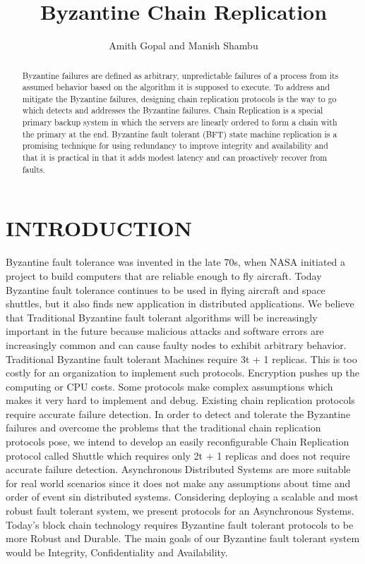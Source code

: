 \documentclass[letterpaper, 10 pt, conference]{ieeeconf}  %
\title{\LARGE \bf
Byzantine Chain Replication
}
\author{Amith Gopal and Manish Shambu%
}
\begin{document}
\maketitle
\thispagestyle{empty}
\pagestyle{empty}


\begin{abstract}

Byzantine failures are defined as arbitrary, unpredictable failures of a process from its assumed behavior based on the algorithm it is supposed to execute. To address and mitigate the Byzantine failures, designing chain replication protocols is the way to go which detects and addresses the Byzantine failures. Chain Replication is a special primary backup system in which the servers are linearly ordered to form a chain with the primary at the end. Byzantine fault tolerant (BFT) state machine replication is a promising technique for using redundancy to improve integrity and availability and that it is practical in that it adds modest latency and can proactively recover from faults.

\end{abstract}


\section{INTRODUCTION}

Byzantine fault tolerance was invented in the late 70s, when NASA initiated a project to build computers that are reliable enough to fly aircraft. Today Byzantine fault tolerance continues to be used in flying aircraft and space shuttles, but it also finds new application in distributed applications. We believe that Traditional Byzantine fault tolerant algorithms will be increasingly important in the future because malicious attacks and software errors are increasingly common and can cause faulty nodes to exhibit arbitrary behavior.
Traditional Byzantine fault tolerant Machines require 3t + 1 replicas. This is too costly for an organization to implement such protocols. Encryption pushes up the computing or CPU costs. Some protocols make complex assumptions which makes it very hard to implement and debug. Existing chain replication protocols require accurate failure detection.
In order to detect and tolerate the Byzantine failures and overcome the problems that the traditional chain replication protocols pose, we intend to develop an easily reconfigurable Chain Replication protocol called Shuttle which requires only 2t + 1 replicas and does not require accurate failure detection.
Asynchronous Distributed Systems are more suitable for real world scenarios since it does not make any assumptions about time and order of event sin distributed systems. Considering deploying a scalable and most robust fault tolerant system, we present protocols for an Asynchronous Systems.
Today’s block chain technology requires Byzantine fault tolerant protocols to be more Robust and Durable. The main goals of our Byzantine fault tolerant system would be Integrity, Confidentiality and Availability.
\end{document}

